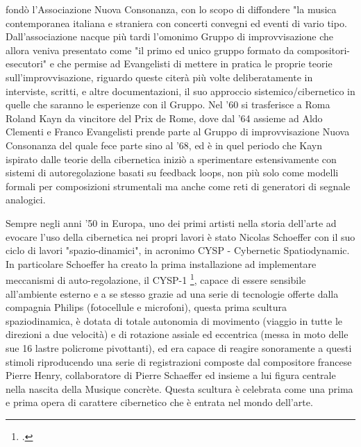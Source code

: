 fondò l'Associazione Nuova Consonanza, con lo scopo di diffondere "la musica contemporanea italiana e straniera con concerti convegni ed eventi di vario tipo.
Dall'associazione nacque più tardi l'omonimo Gruppo di improvvisazione
che allora veniva presentato come "il primo ed unico gruppo formato da compositori-esecutori"
e che permise ad Evangelisti di mettere in pratica le proprie teorie sull'improvvisazione,
riguardo queste citerà più volte deliberatamente in interviste, scritti,
e altre documentazioni, il suo approccio sistemico/cibernetico
in quelle che saranno le esperienze con il Gruppo.
Nel '60 si trasferisce a Roma Roland Kayn da vincitore del Prix de Rome,
dove dal '64 assieme ad Aldo Clementi e Franco Evangelisti
prende parte al Gruppo di improvvisazione Nuova Consonanza
del quale fece parte sino al '68,
ed è in quel periodo che Kayn ispirato dalle teorie della cibernetica iniziò a sperimentare
estensivamente con sistemi di autoregolazione basati su feedback loops,
non più solo come modelli formali per composizioni strumentali
ma anche come reti di generatori di segnale analogici.

Sempre negli anni '50 in Europa, uno dei primi artisti nella storia dell'arte
ad evocare l'uso della cibernetica nei propri lavori è stato
Nicolas Schoeffer con il suo ciclo di lavori "spazio-dinamici", in acronimo
CYSP - Cybernetic Spatiodynamic.
In particolare Schoeffer ha creato la prima installazione ad implementare meccanismi
di auto-regolazione, il CYSP-1 \footcite{SanfilippoValle},
capace di essere sensibile all'ambiente esterno e a se stesso
grazie ad una serie di tecnologie offerte dalla compagnia Philips (fotocellule e microfoni),
questa prima scultura spaziodinamica, è dotata di totale autonomia di movimento
(viaggio in tutte le direzioni a due velocità) e di rotazione assiale ed eccentrica
(messa in moto delle sue 16 lastre policrome pivottanti),
ed era capace di reagire sonoramente a questi stimoli riproducendo
una serie di registrazioni composte dal compositore francese Pierre Henry,
collaboratore di Pierre Schaeffer ed insieme a lui figura centrale nella nascita della Musique concrète.
Questa scultura è celebrata come una prima e prima opera di carattere cibernetico che è entrata nel mondo dell'arte.


